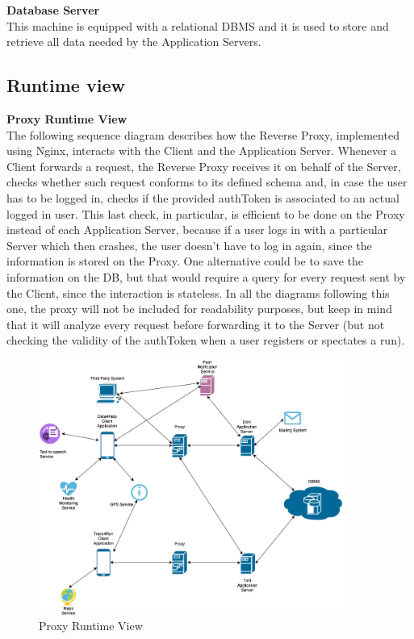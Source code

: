 \documentclass[titlepage]{article}
\begin{document}
{\bf Database Server }\\ 
This machine is equipped with a relational DBMS and it is used to store and retrieve all data needed by the Application Servers. 

\pagebreak


\subsection{Runtime view}

{\bf Proxy Runtime View }\\ 
The following sequence diagram describes how the Reverse Proxy, implemented using Nginx, interacts with the Client and the Application Server.
Whenever a Client forwards a request, the Reverse Proxy receives it on behalf of the Server, checks whether such request conforms to its defined schema and, in case the user has to be logged in, checks if the provided authToken is associated to an actual logged in user. This last check, in particular, is efficient to be done on the Proxy instead of each Application Server, because if a user logs in with a particular Server which then crashes, the user doesn’t have to log in again, since the information is stored on the Proxy. One alternative could be to save the information on the DB, but that would require a query for every request sent by the Client, since the interaction is stateless.
In all the diagrams following this one, the proxy will not be included for readability purposes, but keep in mind that it will analyze every request before forwarding it to the Server (but not checking the validity of the authToken when a user registers or spectates a run).

\begin{figure}[H]
	\center
  	\includegraphics[width=10cm] {Overview.png}%
  	\caption{Proxy Runtime View}
 	\label{fig:PROXY}
\end{figure}
\end{document}
